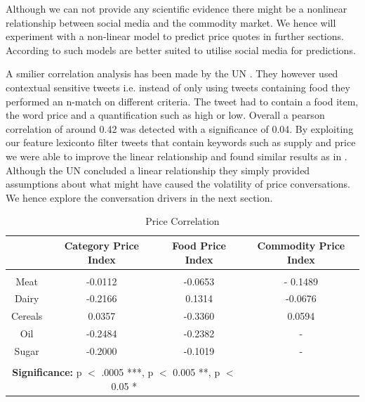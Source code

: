  Although we can not provide any scientific evidence there might be a nonlinear relationship between social media and the commodity market. We hence will experiment with a non-linear model to predict price quotes in further sections. According to \cite{de08} such models are better suited to utilise social media for predictions. 

A smilier correlation analysis has been made by the UN \cite{ungp2013}. They however used contextual sensitive tweets i.e. instead of only using tweets containing food they performed an n-match on different criteria. The tweet had to contain a food item, the word price and a quantification such as high or low. Overall a pearson correlation of around 0.42 was detected with a significance of 0.04. By exploiting our feature lexiconto filter tweets that contain keywords such as supply and price we were able to improve the linear relationship and found similar results as in \cite{ungp2013}. Although the UN concluded a linear relationship they simply provided assumptions about what might have caused the volatility of price conversations. We hence explore the conversation drivers in the next section. 
 

 
\begin{table}[h]   
 \begin{tabular}{  c  | c  | c | c }
			
   & \textbf{Category Price Index}  & \textbf{Food Price Index} & \textbf{Commodity Price Index} \\
  \hline 
  &&& \\
  Meat & -0.0112   & -0.0653 & - 0.1489  \\
  
  Dairy & -0.2166   & 0.1314 & -0.0676\\

  Cereals & 0.0357  & -0.3360 & 0.0594 \\

  Oil & -0.2484  &  -0.2382 & -   \\

  Sugar & -0.2000 & -0.1019 &  - \\

\hline 

\multicolumn{3}{c}{\null}\\

\multicolumn{3}{c}{\textbf{Significance:} p $<$ .0005 ***, p $<$ 0.005 **, p $<$ 0.05 *}\\
\hline  

\end{tabular}
\caption{Price Correlation}
\label{tab:abc}


\end{table}


